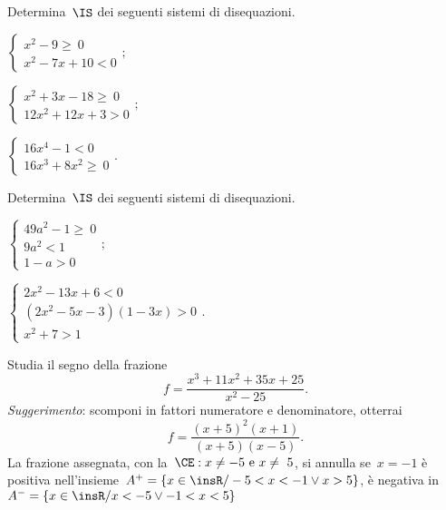 \begin{esercizio}[\Ast]
 \label{ese:21.52}
 Determina~$\IS$ dei seguenti sistemi di disequazioni.
 \begin{multicols}{3}
 \begin{enumeratea}
 \item $\left\{\begin{array}{l}
  x^{2}-9\ge~0\\
  x^{2}-7x+10<0
           \end{array}\right.;$
\item $\left\{\begin{array}{l}
  x^{2}+3x-18\ge~0\\
  12x^{2}+12x+3>0
           \end{array}\right.;$
\item $\left\{\begin{array}{l}
  16x^{4}-1<0 \\
  16x^{3}+8x^{2}\ge~0 \end{array}\right.. $
 \end{enumeratea}
 \end{multicols}
\end{esercizio}

\begin{esercizio}[\Ast]
 \label{ese:21.53}
 Determina~$\IS$ dei seguenti sistemi di disequazioni.
 \begin{multicols}{2}
 \begin{enumeratea}
 \item $\left\{\begin{array}{l}
  49a^{2}-1\ge~0\\
  9a^{2}<1\\
  1-a>0
           \end{array}\right.;$

\item $\left\{\begin{array}{l}
          2x^{2}-13x+6<0\\
          (2x^{2}-5x-3)(1-3x)>0\\
          x^{2}+7>1
           \end{array}\right..$
 \end{enumeratea}
 \end{multicols}
\end{esercizio}

\begin{esercizio}
\label{ese:21.54}
Studia il segno della frazione
\[f=\dfrac{x^{3}+11x^{2}+35x+25}{x^{2}-25}.\]
\emph{Suggerimento}: scomponi in fattori numeratore e denominatore, otterrai
\[ f=\frac{(x+5)^{2}(x+1)}{(x+5)(x-5)}.\]
% 
% 
La frazione assegnata, con la~$\CE: x\neq -5\text{ e }x\neq~5$, si annulla se~$x=-1$
è positiva nell'insieme~$A^{+}=\left\{x\in \insR/-5<x<-1\vee x>5\right\}$, è negativa in
$A^{-}=\left\{x\in\insR/x<-5\vee -1<x<5\right\}$
\end{esercizio}

